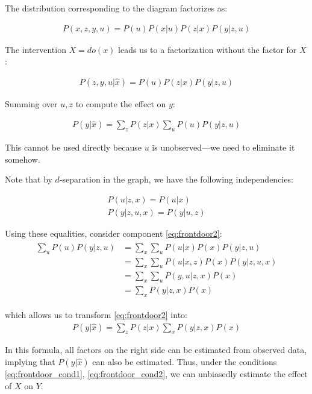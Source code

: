 \documentclass[fleqn]{article}
\numberwithin{equation}{section}
\numberwithin{theorem}{section}
\numberwithin{figure}{section}
\numberwithin{lemma}{section}
\numberwithin{corollary}{section}
\begin{document}
The distribution corresponding to the diagram factorizes as:

\begin{align}
	P(x,z,y,u) = P(u)P(x|u)P(z|x)P(y|z,u)
\end{align}

The intervention $X=do(x)$ leads us to a factorization without the factor for $X$:

\begin{align}
	P(z,y,u|\hat x) = P(u)P(z|x)P(y|z,u)
\end{align}

Summing over $u,z$ to compute the effect on $y$:

\begin{align}
	P(y|\hat x) = \sum\limits_{z}P(z|x)\sum\limits_{u}P(u)P(y|z,u)
	\label{eq:frontdoor2}
\end{align}

This cannot be used directly because $u$ is unobserved—we need to eliminate it somehow.

Note that by $d$-separation in the graph, we have the following independencies:

\begin{align}
	P(u|z,x) = P(u|x)\label{eq:frontdoor_cond1}\\
	P(y|z,u,x) = P(y|u,z)
	\label{eq:frontdoor_cond2}
\end{align}

Using these equalities, consider component \ref{eq:frontdoor2}:
\begin{align}
	\begin{split}
		\sum\limits_{u}P(u)P(y|z,u) &= \sum\limits_{x} \sum\limits_{u}P(u|x)P(x)P(y|z,u)\\ 
		&= \sum\limits_{x} \sum\limits_{u}P(u|x,z)P(x)P(y|z,u,x) \\
		&= \sum\limits_{x} \sum\limits_{u}P(y,u|z,x)P(x) \\
		&= \sum\limits_{x} P(y|z,x)P(x)
	\end{split}
	\label{eq:frontdoor3}
\end{align}

which allows us to transform \ref{eq:frontdoor2} into:
\begin{align}
	P(y|\hat x) = \sum\limits_{z}P(z|x) \sum\limits_{x} P(y|z,x)P(x)
	\label{eq:frontdoor4}
\end{align}

In this formula, all factors on the right side can be estimated from observed data, implying that $P(y|\hat x)$ can also be estimated. Thus, under the conditions \ref{eq:frontdoor_cond1}, \ref{eq:frontdoor_cond2}, we can unbiasedly estimate the effect of $X$ on $Y$.
\end{document}
